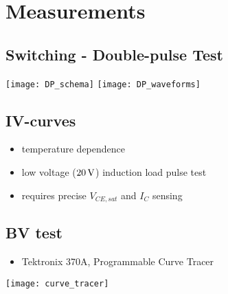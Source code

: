 \section{Measurements} \label{sec:measurements}

\subsection{Switching - Double-pulse Test}
\texttt{[image: DP\_schema]}
\texttt{[image: DP\_waveforms]}

\subsection{IV-curves}
\begin{itemize}
    \item temperature dependence
    \item low voltage ($20\, \mathrm{V}$) induction load pulse test
    \item requires precise $V_{CE,sat}$ and $I_C$ sensing
\end{itemize}

\subsection{BV test}
\begin{itemize}
    \item Tektronix 370A, Programmable Curve Tracer
\end{itemize}

\texttt{[image: curve\_tracer]}
